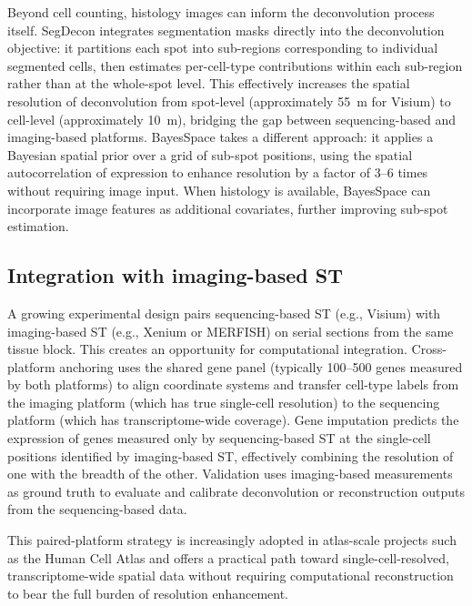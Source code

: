 Beyond cell counting, histology images can inform the deconvolution process itself. SegDecon integrates segmentation masks directly into the deconvolution objective: it partitions each spot into sub-regions corresponding to individual segmented cells, then estimates per-cell-type contributions within each sub-region rather than at the whole-spot level. This effectively increases the spatial resolution of deconvolution from spot-level (approximately 55~\textmu m for Visium) to cell-level (approximately 10~\textmu m), bridging the gap between sequencing-based and imaging-based platforms. BayesSpace \citep{zhao2022bulk2space} takes a different approach: it applies a Bayesian spatial prior over a grid of sub-spot positions, using the spatial autocorrelation of expression to enhance resolution by a factor of 3--6 times without requiring image input. When histology is available, BayesSpace can incorporate image features as additional covariates, further improving sub-spot estimation.

\subsection{Integration with imaging-based ST}

A growing experimental design pairs sequencing-based ST (e.g., Visium) with imaging-based ST (e.g., Xenium or MERFISH) on serial sections from the same tissue block. This creates an opportunity for computational integration. Cross-platform anchoring uses the shared gene panel (typically 100--500 genes measured by both platforms) to align coordinate systems and transfer cell-type labels from the imaging platform (which has true single-cell resolution) to the sequencing platform (which has transcriptome-wide coverage). Gene imputation predicts the expression of genes measured only by sequencing-based ST at the single-cell positions identified by imaging-based ST, effectively combining the resolution of one with the breadth of the other. Validation uses imaging-based measurements as ground truth to evaluate and calibrate deconvolution or reconstruction outputs from the sequencing-based data.

This paired-platform strategy is increasingly adopted in atlas-scale projects such as the Human Cell Atlas and offers a practical path toward single-cell-resolved, transcriptome-wide spatial data without requiring computational reconstruction to bear the full burden of resolution enhancement.
